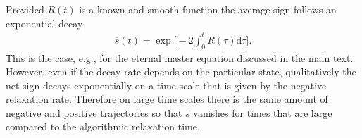 \documentclass[twocolumn,prl,superscriptaddress]{revtex4-2}
\begin{document}
Provided $R(t)$ is a known and smooth function the average sign follows an exponential decay 
\begin{align}
	\overline{s}(t) = \exp\Big[-2 \int_0^t R(\tau) \mathrm d \tau \Big].
\end{align}
This is the case, e.g., for the eternal master equation discussed in the main text. However, even if the decay rate depends on the particular state, qualitatively the net sign decays exponentially on a time scale that is given by the negative relaxation rate. Therefore on large time scales there is the same amount of negative and positive trajectories so that $\bar{s}$ vanishes for times that are large compared to the algorithmic relaxation time. 

\end{document}
